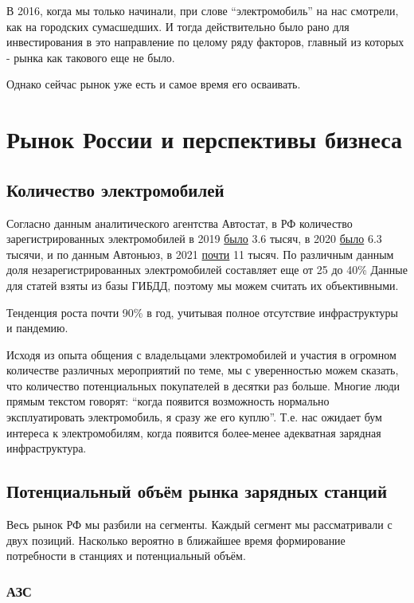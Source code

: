 \documentclass[a4paper,12pt]{report}
\begin{document}
В 2016, когда мы только начинали, при слове “электромобиль” на нас смотрели, как на городских сумасшедших. И тогда действительно было рано для инвестирования в это направление по целому ряду факторов, главный из которых - рынка как такового еще не было. 

Однако сейчас рынок уже есть и самое время его осваивать.  

\chapter{Рынок России и перспективы бизнеса}

\section{Количество электромобилей}

Согласно данным аналитического агентства Автостат, в РФ количество зарегистрированных электромобилей в 2019 \href{https://www.autostat.ru/news/38371/}{было} 3.6 тысяч, в 2020 \href{https://www.autostat.ru/news/42999/}{было} 6.3 тысячи, и по данным Автоньюз, в 2021 \href{https://www.autonews.ru/news/602002889a7947acbb3fd189}{почти} 11 тысяч. По различным данным доля незарегистрированных электромобилей составляет еще от 25 до 40\% Данные для статей взяты из базы ГИБДД, поэтому мы можем считать их объективными. 

Тенденция роста почти 90\% в год, учитывая полное отсутствие инфраструктуры и пандемию.

Исходя из опыта общения с владельцами электромобилей и участия в огромном количестве различных мероприятий по теме, мы с уверенностью можем сказать, что количество потенциальных покупателей в десятки раз больше. Многие люди прямым текстом говорят: “когда появится возможность нормально эксплуатировать электромобиль, я сразу же его куплю”. Т.е. нас ожидает бум интереса к электромобилям, когда появится более-менее адекватная зарядная инфраструктура. 

\section{Потенциальный объём рынка зарядных станций}

Весь рынок РФ мы разбили на сегменты. Каждый сегмент мы рассматривали с двух позиций. Насколько вероятно в ближайшее время формирование потребности в станциях и потенциальный объём. 

\subsection{АЗС}
\end{document}
